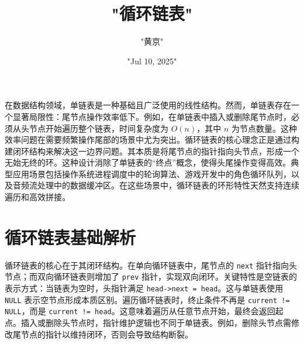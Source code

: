 \title{"循环链表"}
\author{"黄京"}
\date{"Jul 10, 2025"}
\maketitle
在数据结构领域，单链表是一种基础且广泛使用的线性结构。然而，单链表存在一个显著局限性：尾节点操作效率低下。例如，在单链表中插入或删除尾节点时，必须从头节点开始遍历整个链表，时间复杂度为 $O(n)$，其中 $n$ 为节点数量。这种效率问题在需要频繁操作尾部的场景中尤为突出。循环链表的核心理念正是通过构建闭环结构来解决这一边界问题。其本质是将尾节点的指针指向头节点，形成一个无始无终的环。这种设计消除了单链表的“终点”概念，使得头尾操作变得高效。典型应用场景包括操作系统进程调度中的轮询算法、游戏开发中的角色循环队列，以及音频流处理中的数据缓冲区。在这些场景中，循环链表的环形特性天然支持连续遍历和高效拼接。\par
\chapter{循环链表基础解析}
循环链表的核心在于其闭环结构。在单向循环链表中，尾节点的 \texttt{next} 指针指向头节点；而双向循环链表则增加了 \texttt{prev} 指针，实现双向闭环。关键特性是空链表的表示方式：当链表为空时，头指针满足 \texttt{head->next = head}。这与单链表使用 \texttt{NULL} 表示空节点形成本质区别。遍历循环链表时，终止条件不再是 \texttt{current != NULL}，而是 \texttt{current != head}。这意味着遍历从任意节点开始，最终会返回起点。插入或删除头节点时，指针维护逻辑也不同于单链表。例如，删除头节点需修改尾节点的指针以维持闭环，否则会导致结构断裂。\par
